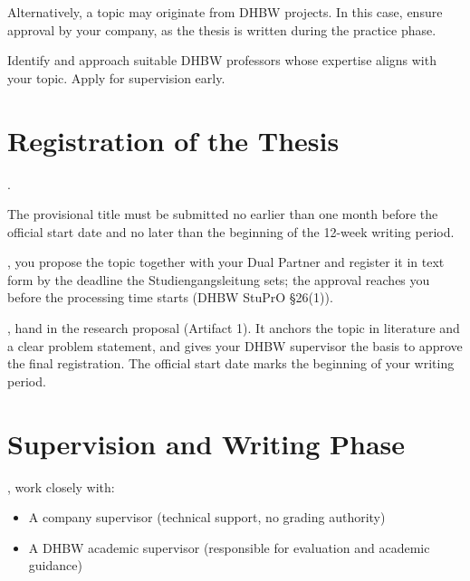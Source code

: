 \documentclass{../sharedAssets/tufte}
\begin{document}
Alternatively, a topic may originate from DHBW projects. In this case, ensure approval by your company, as the thesis is written during the practice phase.

Identify and approach suitable DHBW professors whose expertise aligns with your topic. Apply for supervision early.

\section{Registration of the Thesis}
. 

The provisional title must be submitted no earlier than one month before the official start date and no later than the beginning of the 12-week writing period.

, you propose the topic together with your Dual Partner and register it in text form by the deadline the Studiengangsleitung sets; the approval reaches you before the processing time starts (DHBW StuPrO \S26(1)).

, hand in the research proposal (Artifact 1). It anchors the topic in literature and a clear problem statement, and gives your DHBW supervisor the basis to approve the final registration.
The official start date marks the beginning of your writing period.

\section{Supervision and Writing Phase}
, work closely with:
\begin{itemize}
    \item A company supervisor (technical support, no grading authority)
    \item A DHBW academic supervisor (responsible for evaluation and academic guidance)
\end{itemize}
\end{document}
